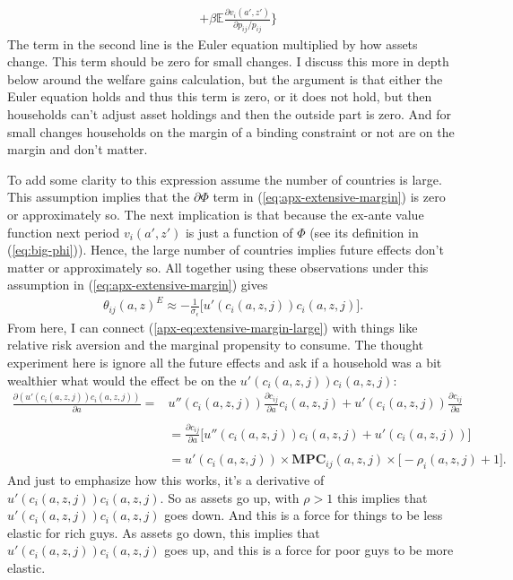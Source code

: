 \documentclass[12pt,pdftex]{article}
\begin{document}
\begin{onehalfspacing}
{\begin{align}
\nonumber \\
&+  \beta \mathbb{E}\frac{\partial v_{i}(a',z')}{\partial p_{ij}/ p_{ij}} \bigg \}
\end{align}}
The term in the second line is the Euler equation multiplied by how assets change. This term should be zero for small changes. I discuss this more in depth below around the welfare gains calculation, but the argument is that either the Euler equation holds and thus this term is zero, or it does not hold, but then households can't adjust asset holdings and then the outside part is zero. And for small changes households on the margin of a binding constraint or not are on the margin and don't matter.

To add some clarity to this expression assume the number of countries is large. This assumption implies that the $\partial \Phi$ term in (\ref{eq:apx-extensive-margin}) is zero or approximately so. The next implication is that because the ex-ante value function next period $v_{i}(a',z')$ is just a function of $\Phi$ (see its definition in (\ref{eq:big-phi})). Hence, the large number of countries implies future effects don't matter or approximately so. All together using these observations under this assumption in (\ref{eq:apx-extensive-margin}) gives
\begin{align}
\theta_{ij}(a,z)^{E} \approx -\frac{1}{\sigma_{\epsilon}}\bigg[u'(c_{i}(a,z,j))c_{i}(a,z,j)\bigg]. \label{apx-eq:extensive-margin-large}
\end{align}
From here, I can connect (\ref{apx-eq:extensive-margin-large}) with things like relative risk aversion and the marginal propensity to consume. The thought experiment here is ignore all the future effects and ask if a household was a bit wealthier what would the effect be on the $u'(c_{i}(a,z,j))c_{i}(a,z,j)$:
\begin{align}
\frac{\partial (u'(c_{i}(a,z,j))c_{i}(a,z,j))}{\partial a} =& u''(c_{i}(a,z,j))\frac{\partial c_{ij}}{\partial a}c_{i}(a,z,j) + u'(c_{i}(a,z,j))\frac{\partial c_{ij}}{\partial a} \\
\nonumber \\
&= \frac{\partial c_{ij}}{\partial a}\bigg[u''(c_{i}(a,z,j))c_{i}(a,z,j) + u'(c_{i}(a,z,j)) \bigg] \\
\nonumber\\
&= u'(c_{i}(a,z,j))\times \mathbf{MPC}_{ij}(a,z,j) \times \bigg[-\rho_{i}(a,z,j) + 1\bigg]. \label{eq:apx-elasticity-mpc}
\end{align}
And just to emphasize how this works, it's a derivative of $u'(c_{i}(a,z,j))c_{i}(a,z,j)$. So as assets go up, with $\rho > 1$ this implies that $u'(c_{i}(a,z,j))c_{i}(a,z,j)$ goes down. And this is a force for things to be less elastic for rich guys. As assets go down, this implies that $u'(c_{i}(a,z,j))c_{i}(a,z,j)$ goes up, and this is a force for poor guys to be more elastic.


\end{onehalfspacing}
\end{document}
